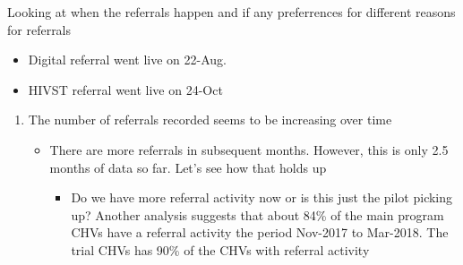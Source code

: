 \documentclass[11pt]{article}
\providecommand{\tightlist}{%
      \setlength{\itemsep}{0pt}\setlength{\parskip}{0pt}}
\begin{document}
    Looking at when the referrals happen and if any preferrences for
different reasons for referrals

\begin{itemize}
\tightlist
\item
  Digital referral went live on 22-Aug.
\item
  HIVST referral went live on 24-Oct
\end{itemize}

\begin{enumerate}
\def\labelenumi{\arabic{enumi}.}
\tightlist
\item
  The number of referrals recorded seems to be increasing over time

  \begin{itemize}
  \tightlist
  \item
    There are more referrals in subsequent months. However, this is only
    2.5 months of data so far. Let's see how that holds up

    \begin{itemize}
    \tightlist
    \item
      Do we have more referral activity now or is this just the pilot
      picking up? Another analysis suggests that about 84\% of the main
      program CHVs have a referral activity the period Nov-2017 to
      Mar-2018. The trial CHVs has 90\% of the CHVs with referral
      activity
    \end{itemize}
  \end{itemize}
\end{enumerate}
\end{document}
